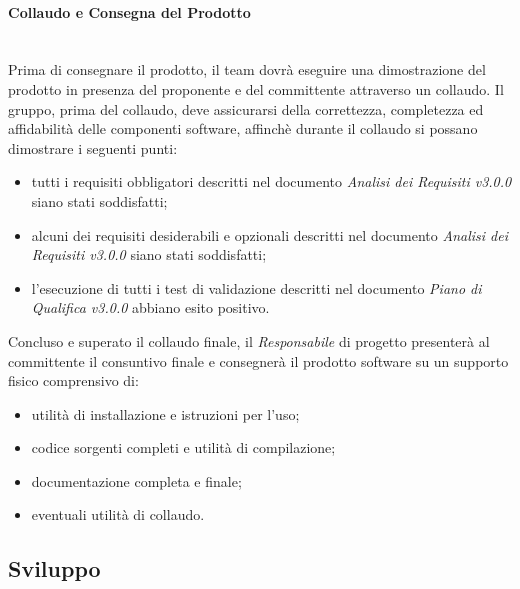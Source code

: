 \paragraph{Collaudo e Consegna del Prodotto} \label{ProcessiPrimari_Collaudo} \-\\
Prima di consegnare il prodotto, il team dovrà eseguire una dimostrazione del prodotto
in presenza del proponente e del committente attraverso un collaudo. Il gruppo, prima del collaudo, deve assicurarsi della correttezza, completezza ed affidabilità delle componenti software, affinchè durante il collaudo si possano dimostrare i seguenti punti:
\begin{itemize}
	\item tutti i requisiti obbligatori descritti nel documento \textit{Analisi dei Requisiti v3.0.0} siano stati soddisfatti;
	\item alcuni dei requisiti desiderabili e opzionali descritti nel documento \textit{Analisi dei Requisiti v3.0.0} siano stati soddisfatti;
	\item l'esecuzione di tutti i test di validazione descritti nel documento \textit{Piano di Qualifica v3.0.0} abbiano esito positivo.
\end{itemize} 
Concluso e superato il collaudo finale, il \textit{Responsabile} di progetto presenterà al committente il consuntivo finale e consegnerà il prodotto software su un supporto fisico comprensivo di:
\begin{itemize}
	\item utilità di installazione e istruzioni per l'uso;
	\item codice sorgenti completi e utilità di compilazione;
	\item documentazione completa e finale;
	\item eventuali utilità di collaudo. 
\end{itemize}

\subsection{Sviluppo}\label{Sviluppo}
